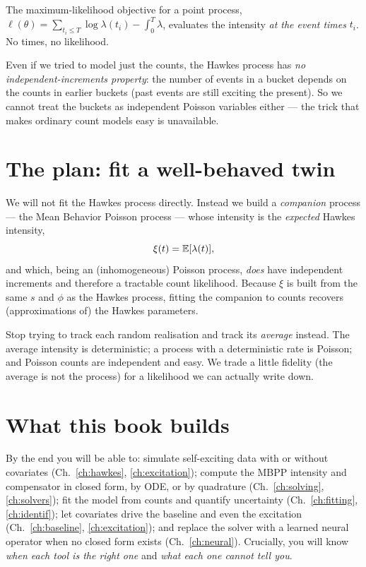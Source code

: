 \begin{whybox}[: timestamps]
The maximum-likelihood objective for a point process,
$\ell(\theta)=\sum_{t_i\le T}\log\lambda(t_i)-\int_0^T\lambda$, evaluates the
intensity \emph{at the event times} $t_i$. No times, no likelihood.
\end{whybox}

\begin{whybox}
Even if we tried to model just the counts, the Hawkes process has \emph{no
independent-increments property}: the number of events in a bucket depends on the
counts in earlier buckets (past events are still exciting the present). So we
cannot treat the buckets as independent Poisson variables either --- the trick that
makes ordinary count models easy is unavailable.
\end{whybox}

\section{The plan: fit a well-behaved twin}

We will not fit the Hawkes process directly. Instead we build a \emph{companion}
process --- the Mean Behavior Poisson process --- whose intensity is the
\emph{expected} Hawkes intensity,
\begin{equation}
\xi(t)=\mathbb{E}[\lambda(t)],
\label{eq:ch1-mbpp}
\end{equation}
and which, being an (inhomogeneous) Poisson process, \emph{does} have independent
increments and therefore a tractable count likelihood. Because $\xi$ is built from
the same $s$ and $\phi$ as the Hawkes process, fitting the companion to counts
recovers (approximations of) the Hawkes parameters.

\begin{intuitionbox}
Stop trying to track each random realisation and track its \emph{average} instead.
The average intensity is deterministic; a process with a deterministic rate is
Poisson; and Poisson counts are independent and easy. We trade a little fidelity
(the average is not the process) for a likelihood we can actually write down.
\end{intuitionbox}

\section{What this book builds}

By the end you will be able to: simulate self-exciting data with or without
covariates (Ch.~\ref{ch:hawkes}, \ref{ch:excitation}); compute the MBPP intensity
and compensator in closed form, by ODE, or by quadrature (Ch.~\ref{ch:solving},
\ref{ch:solvers}); fit the model from counts and quantify uncertainty
(Ch.~\ref{ch:fitting}, \ref{ch:identif}); let covariates drive the baseline and
even the excitation (Ch.~\ref{ch:baseline}, \ref{ch:excitation}); and replace the
solver with a learned neural operator when no closed form exists
(Ch.~\ref{ch:neural}). Crucially, you will know \emph{when each tool is the right
one} and \emph{what each one cannot tell you}.

